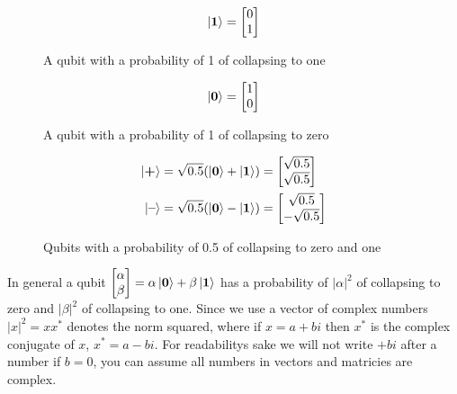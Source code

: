 \newcommand{\qto}{\mathbf{1}}
\newcommand{\qtz}{\mathbf{0}}
\newcommand{\qtp}{\textbf{+}}
\newcommand{\qtm}{\textbf{--}}
\begin{figure}[H]
    \centering
    \begin{equation*}
        \ket{\qto} =\qo    
    \end{equation*}
    \caption{A qubit with a probability of 1 of collapsing 
    to one}
    \label{fig:q1}
\end{figure}
\begin{figure}[H]
    \centering
    \begin{equation*}
        \ket{\qtz} =\qz
    \end{equation*}
    \caption{A qubit with a probability of 1 of collapsing to zero}
    \label{fig:q0}
\end{figure}
\begin{figure}[H]
    \centering
    \begin{align*}
    \ket{\qtp} &= \sqrt{0.5}(\ket{\qtz} + \ket{\qto}) = \qp\\
    \ket{\qtm} &= \sqrt{0.5}(\ket{\qtz} - \ket{\qto}) = \qm
    \end{align*}
    \caption{Qubits with a probability of 0.5 of collapsing to zero and one}
    \label{fig:q+}
\end{figure}
\noindent
In general a qubit
$
\begin{bmatrix}
    \alpha\\
    \beta\\
\end{bmatrix}
= \alpha \ket{\qtz} + \beta \ket{\qto}
$
has a probability of $|\alpha|^2$ of collapsing to zero and $|\beta|^2$ of collapsing to one.
Since we use a vector of complex numbers $|x|^2=xx^*$ denotes the norm squared, where if $x=a+bi$ then $x^*$ is the complex conjugate of $x$, $x^* =a-bi$.
For readabilitys sake we will not write $+bi$ after a number if $b=0$, you can assume all numbers in vectors and matricies are complex.

